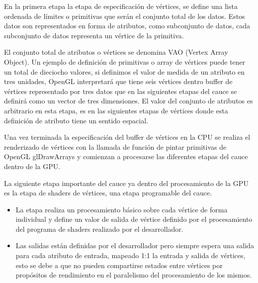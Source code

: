 \documentclass[a4paper, 17pt]{book}
\begin{document}
En la primera etapa la etapa de especificación de vértices, se define una lista ordenada de límites o primitivas que serán el conjunto
total de los datos. Estos datos son representados en forma de atributos, como subconjunto de datos, cada subconjunto de datos
representa un vértice de la primitiva.

\vspace{1mm} %

El conjunto total de atributos o vértices se denomina VAO (Vertex Array Object). Un ejemplo de definición de primitivas o array de
vértices puede tener un total de dieciocho valores, si definimos el valor de medida de un atributo en tres unidades, OpenGL
interpretará que tiene seis vértices dentro buffer de vértices representado por tres datos que en las siguientes etapas del
cauce se definirá como un vector de tres dimensiones. El valor del conjunto de atributos es arbitrario en esta etapa, es en las
siguientes etapas de vértices donde esta definición de atributo tiene un sentido espacial.

\vspace{1mm} %

Una vez terminada la especificación del buffer de vértices en la CPU se realiza el renderizado de vértices con la llamada de
función de pintar primitivas de OpenGL glDrawArrays y comienzan a procesarse las diferentes etapas del cauce dentro de la GPU.

\vspace{1mm} %

La siguiente etapa importante del cauce ya dentro del procesamiento de la GPU es la etapa de shaders de vértices, una etapa
programable del cauce. 

\begin{itemize}
  \item La etapa realiza un procesamiento básico sobre cada vértice de forma individual y define un valor de salida de vértice
  definido por el procesamiento del programa de shaders realizado por el desarrollador. 
  
  \item Las salidas están definidas por el desarrollador pero siempre espera una salida para cada atributo de entrada, mapeado 1:1
  la entrada y salida de vértices, esto se debe a que no pueden compartirse estados entre vértices por propósitos de rendimiento
  en el paralelismo del procesamiento de los mismos.
\end{itemize}
\end{document}
